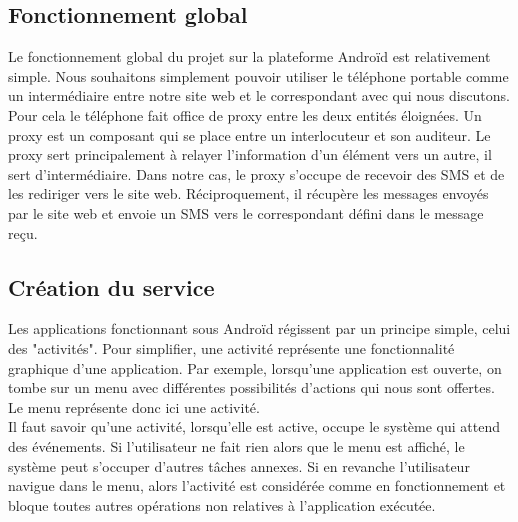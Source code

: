 \subsection{Fonctionnement global}

Le fonctionnement global du projet sur la plateforme Androïd est relativement simple. Nous souhaitons
simplement pouvoir utiliser le téléphone portable comme un intermédiaire entre notre site web et le 
correspondant avec qui nous discutons. Pour cela le téléphone fait office de proxy entre les deux 
entités éloignées. Un proxy est un composant qui se place entre un interlocuteur et son auditeur. Le 
proxy sert principalement à relayer l'information d'un élément vers un autre, il sert d'intermédiaire.
Dans notre cas, le proxy s'occupe de recevoir des SMS et de les rediriger vers le site web. 
Réciproquement, il récupère les messages envoyés par le site web et envoie un SMS vers le correspondant
défini  dans le message reçu.



\subsection{Création du service}

Les applications fonctionnant sous Androïd régissent par un principe simple, celui des "activités".
Pour simplifier, une activité représente une fonctionnalité graphique d'une application. Par exemple,
lorsqu'une application est ouverte, on tombe sur un menu avec différentes possibilités d'actions 
qui nous sont offertes. Le menu représente donc ici une activité.
\\


Il faut savoir qu’une activité, lorsqu'elle est active, occupe le système qui attend des événements.
Si l'utilisateur ne fait rien alors que le menu est affiché, le système peut s'occuper d'autres 
tâches annexes. Si en revanche l'utilisateur navigue dans le menu, alors l'activité est considérée
comme en fonctionnement et bloque toutes autres opérations non relatives à l'application exécutée.
\\


